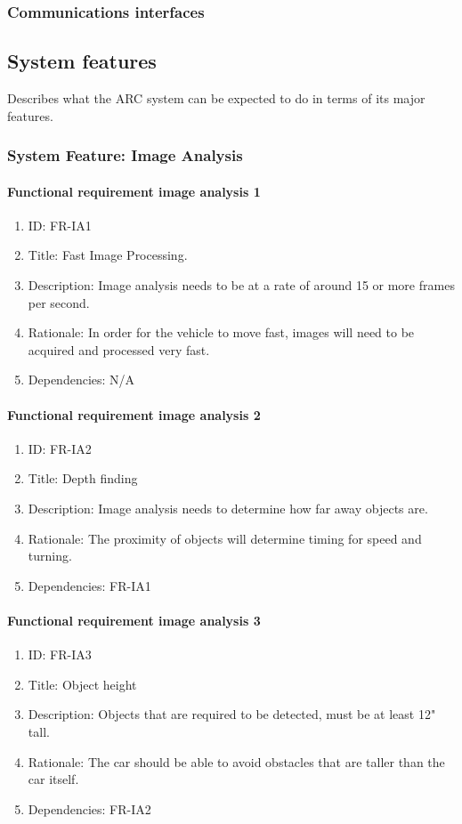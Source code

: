 \documentclass[compsoc,draftclsnofoot,onecolumn,10pt]{IEEEtran}
\begin{document}
	\subsubsection{Communications interfaces}


\subsection{System features}
Describes what the ARC system can be expected to do in terms of its major features.

\subsubsection{System Feature: Image Analysis}
	
	\paragraph{Functional requirement image analysis 1}
		\begin{enumerate}
			\item ID: FR-IA1
			\item Title: Fast Image Processing.
			\item Description: Image analysis needs to be at a rate of around 15 or more frames per second.
			\item Rationale: In order for the vehicle to move fast, images will need to be acquired and processed very fast.
			\item Dependencies: N/A
		\end{enumerate}	

	\paragraph{Functional requirement image analysis 2}
		\begin{enumerate}
			\item ID: FR-IA2
			\item Title: Depth finding
			\item Description: Image analysis needs to determine how far away objects are.
			\item Rationale: The proximity of objects will determine timing for speed and turning. 
			\item Dependencies: FR-IA1
		\end{enumerate}
	
	\paragraph{Functional requirement image analysis 3}
		\begin{enumerate}
			\item ID: FR-IA3
			\item Title: Object height
			\item Description: Objects that are required to be detected, must be at least 12" tall. 
			\item Rationale: The car should be able to avoid obstacles that are taller than the car itself. 
			\item Dependencies: FR-IA2
		\end{enumerate}
\end{document}

